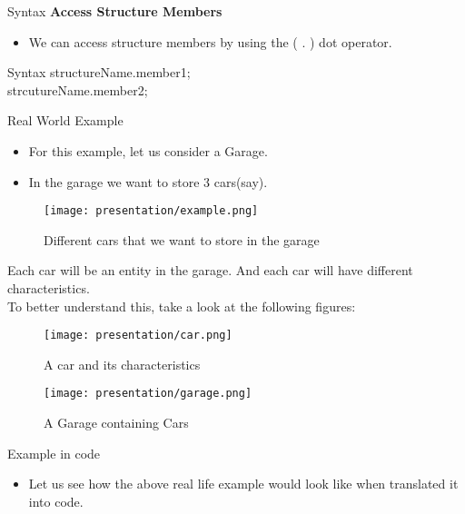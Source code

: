 \documentclass[13pt]{beamer}
\begin{document}
\begin{frame}{Syntax}
{\textbf{Access Structure Members}} 
\begin{itemize}
    \item We can access structure members by using the ( . ) dot operator.
\end{itemize}
\begin{block}{Syntax}
    structureName.member1; \\
    strcutureName.member2;
\end{block}
\end{frame}

\begin{frame}{Real World Example}
\begin{itemize}
    \item For this example, let us consider a Garage.
    \item In the garage we want to store 3 cars(say).
\end{itemize}
\begin{figure}
    \centering
    \texttt{[image: presentation/example.png]}
    \caption{Different cars that we want to store in the garage}
    \label{fig:enter-label}
\end{figure}
\end{frame}

\begin{frame}
    Each car will be an entity in the garage. And each car will have different  characteristics. \\
    To better understand this, take a look at the following figures: \\
    \begin{figure}
        \centering
        \texttt{[image: presentation/car.png]}
        \caption{A car and its characteristics}
        \label{fig:1}
    \end{figure}
\end{frame}

\begin{frame}
    \begin{figure}
        \centering
        \texttt{[image: presentation/garage.png]}
        \caption{A Garage containing Cars}
        \label{fig:2}
    \end{figure}
\end{frame}

\begin{frame}{Example in code}
    \begin{itemize}
        \item Let us see how the above real life example would look like when translated it into code.
    \end{itemize}
\end{frame}
\end{document}
